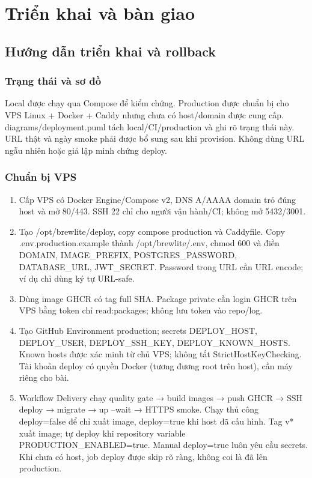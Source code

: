 \documentclass[a4paper,12pt,oneside]{report}
\begin{document}
\chapter{Triển khai và bàn giao}

\section{Hướng dẫn triển khai và rollback}

\subsection{Trạng thái và sơ đồ}
Local được chạy qua Compose để kiểm chứng. Production được chuẩn bị cho VPS Linux + Docker + Caddy nhưng chưa có host/\allowbreak{}domain được cung cấp. {\small\ttfamily diagrams/\allowbreak{}deployment.\allowbreak{}puml} tách local/\allowbreak{}CI/\allowbreak{}production và ghi rõ trạng thái này. URL thật và ngày smoke phải được bổ sung sau khi provision. Không dùng URL ngẫu nhiên hoặc giả lập minh chứng deploy.


\subsection{Chuẩn bị VPS}
\begin{enumerate}
\item Cấp VPS có Docker Engine/\allowbreak{}Compose v2, DNS A/\allowbreak{}AAAA domain trỏ đúng host và mở 80/\allowbreak{}443. SSH 22 chỉ cho người vận hành/\allowbreak{}CI; không mở 5432/\allowbreak{}3001.
\item Tạo {\small\ttfamily /\allowbreak{}opt/\allowbreak{}brewlite/\allowbreak{}deploy}, copy compose production và Caddyfile. Copy {\small\ttfamily .\allowbreak{}env.\allowbreak{}production.\allowbreak{}example} thành {\small\ttfamily /\allowbreak{}opt/\allowbreak{}brewlite/\allowbreak{}.\allowbreak{}env}, chmod 600 và điền DOMAIN, IMAGE\_PREFIX, POSTGRES\_PASSWORD, DATABASE\_URL, JWT\_SECRET. Password trong URL cần URL encode; ví dụ chỉ dùng ký tự URL-safe.
\item Dùng image GHCR có tag full SHA. Package private cần login GHCR trên VPS bằng token chỉ read:packages; không lưu token vào repo/\allowbreak{}log.
\item Tạo GitHub Environment {\small\ttfamily production}; secrets {\small\ttfamily DEPLOY\_\allowbreak{}HOST}, {\small\ttfamily DEPLOY\_\allowbreak{}USER}, {\small\ttfamily DEPLOY\_\allowbreak{}SSH\_\allowbreak{}KEY}, {\small\ttfamily DEPLOY\_\allowbreak{}KNOWN\_\allowbreak{}HOSTS}. Known hosts được xác minh từ chủ VPS; không tắt StrictHostKeyChecking. Tài khoản deploy có quyền Docker (tương đương root trên host), cần máy riêng cho bài.
\item Workflow Delivery chạy quality gate → build images → push GHCR → SSH deploy → migrate → up --wait → HTTPS smoke. Chạy thủ công deploy=false để chỉ xuất image, deploy=true khi host đã cấu hình. Tag {\small\ttfamily v*} xuất image; tự deploy khi repository variable {\small\ttfamily PRODUCTION\_\allowbreak{}ENABLED=true}. Manual deploy=true luôn yêu cầu secrets. Khi chưa có host, job deploy được skip rõ ràng, không coi là đã lên production.
\end{enumerate}
\end{document}
